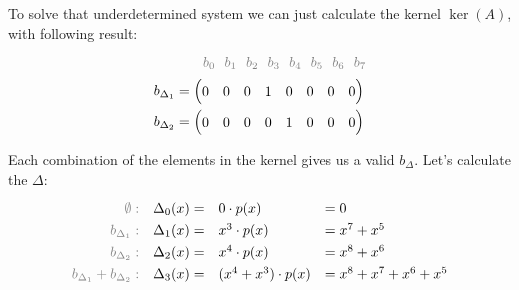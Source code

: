 \documentclass[10pt]{article}
\begin{document}
To solve that underdetermined system we can just calculate the kernel $\ker(A)$, with following result:
\begin{equation}
	\begin{aligned}
		             & \ \ \ \ \ \ \color{gray}\begin{matrix}
			                                       b_0 & \!\! b_1 & \!\! b_2 & \!\! b_3 & \!\! b_4 & \!\! b_5 & \!\! b_6 & \!\! b_7
		                                       \end{matrix} \\
		b_{\Delta_1} & = \begin{pmatrix}
			                 0 & 0 & 0 & 1 & 0 & 0 & 0 & 0
		                 \end{pmatrix}                                                                          \\
		b_{\Delta_2} & = \begin{pmatrix}
			                 0 & 0 & 0 & 0 & 1 & 0 & 0 & 0
		                 \end{pmatrix}
	\end{aligned}
\end{equation}

Each combination of the elements in the kernel gives us a valid $b_\Delta$. Let's calculate the $\Delta$:
\begin{equation}
	\def\arraystretch{1.3}
	\begin{array}{rlll}
		\color{gray} \emptyset:                 & \Delta_0(x)  = & 0 \cdot p(x)         & = 0                     \\
		\color{gray} b_{\Delta_1}:              & \Delta_1(x)  = & x^3 \cdot p(x)       & = x^7 + x^5             \\
		\color{gray} b_{\Delta_2}:              & \Delta_2(x)  = & x^4 \cdot p(x)       & = x^8 + x^6             \\
		\color{gray} b_{\Delta_1}+b_{\Delta_2}: & \Delta_3(x)  = & (x^4+x^3) \cdot p(x) & = x^8 + x^7 + x^6 + x^5
	\end{array}
\end{equation}
\end{document}
